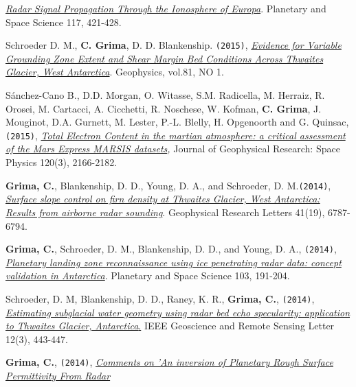 \begin{etaremune}
  \emph{\href{http://www.sciencedirect.com/science/article/pii/S0032063315002470}{Radar
  Signal Propagation Through the Ionosphere of Europa}}. Planetary and
  Space Science 117, 421-428.
\item
  Schroeder D. M., \textbf{C. Grima}, D. D. Blankenship. \texttt{(2015)},
  \emph{\href{http://library.seg.org/doi/abs/10.1190/geo2015-0122.1}{Evidence
  for Variable Grounding Zone Extent and Shear Margin Bed Conditions
  Across Thwaites Glacier, West Antarctica}}. Geophysics, vol.81, NO 1.
\item
  Sánchez-Cano B., D.D. Morgan, O. Witasse, S.M. Radicella, M. Herraiz,
  R. Orosei, M. Cartacci, A. Cicchetti, R. Noschese, W. Kofman,
  \textbf{C. Grima}, J. Mouginot, D.A. Gurnett, M. Lester, P.-L. Blelly,
  H. Opgenoorth and G. Quinsac, \texttt{(2015)},
  \emph{\href{http://onlinelibrary.wiley.com/doi/10.1002/2014JA020630/abstract}{Total
  Electron Content in the martian atmosphere: a critical assessment of
  the Mars Express MARSIS datasets},} Journal of Geophysical Research:
  Space Physics 120(3), 2166-2182.
\item
  \textbf{Grima, C.}, Blankenship, D. D., Young, D. A., and Schroeder,
  D. M.\texttt{(2014)},
  \href{http://onlinelibrary.wiley.com/enhanced/doi/10.1002/2014GL061635/}{\emph{Surface
  slope control on firn density at Thwaites Glacier, West Antarctica:
  Results from airborne radar sounding}}. Geophysical Research Letters
  41(19), 6787-6794.
\item
  \textbf{Grima, C.}, Schroeder, D. M., Blankenship, D. D., and Young,
  D. A., \texttt{(2014)},
  \href{http://www.sciencedirect.com/science/article/pii/S0032063314002244}{\emph{Planetary
  landing zone reconnaissance using ice penetrating radar data: concept
  validation in Antarctica}}. Planetary and Space Science 103, 191-204.
\item
  Schroeder, D. M, Blankenship, D. D., Raney, K. R., \textbf{Grima, C.},
  \texttt{(2014)},
  \href{http://ieeexplore.ieee.org/xpl/login.jsp?tp=\&arnumber=6901268\&url=http\%3A\%2F\%2Fieeexplore.ieee.org\%2Fstamp\%2Fstamp.jsp\%3Ftp\%3D\%26arnumber\%3D6901268}{\emph{Estimating
  subglacial water geometry using radar bed echo specularity:
  application to Thwaites Glacier, Antarctica}.} IEEE Geoscience and
  Remote Sensing Letter 12(3), 443-447.
\item
  \textbf{Grima, C.}, \texttt{(2014)},
  \emph{\href{http://ieeexplore.ieee.org/xpl/articleDetails.jsp?tp=\&arnumber=6827185\&queryText\%3Dgrima}{Comments
  on 'An inversion of Planetary Rough Surface Permittivity From Radar
}}
\end{etaremune}
